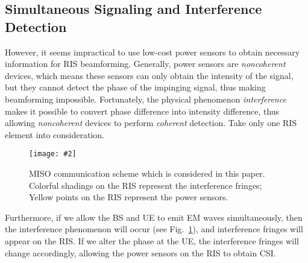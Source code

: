 \documentclass[12pt,draftclsnofoot,journal,onecolumn]{IEEEtran}
\theoremstyle{nonumberplain}
\newcommand{\myincludegraphics}[2][width=12cm]{\texttt{[image: \#2]}}
\begin{document}
\subsection{Simultaneous Signaling and Interference Detection}
    However, it seems impractical to use low-cost power sensors to obtain necessary information for RIS beamforming. Generally, power sensors are {\it noncoherent} devices, which means these sensors can only obtain the intensity of the signal, but they cannot detect the phase of the impinging signal, thus making beamforming impossible. Fortunately, the physical phenomenon {\it interference} makes it possible to convert phase difference into intensity difference, thus allowing {\it noncoherent} devices to perform {\it coherent} detection. Take only one RIS element into consideration.     \begin{figure}[htbp]
        \centering
        \myincludegraphics{figures/scheme.pdf}
        \caption{MISO communication scheme which is considered in this paper. Colorful shadings on the RIS represent the interference fringes; Yellow points on the RIS represent the power sensors.}
        \label{fig:scheme}
    \end{figure}
    Furthermore, if we allow the BS and UE to emit EM waves simultaneously, then the interference phenomenon will occur (see Fig.~\ref{fig:scheme}), and interference fringes will appear on the RIS. If we alter the phase at the UE, the interference fringes will change accordingly, allowing the power sensors on the RIS to obtain CSI. 
\end{document}
